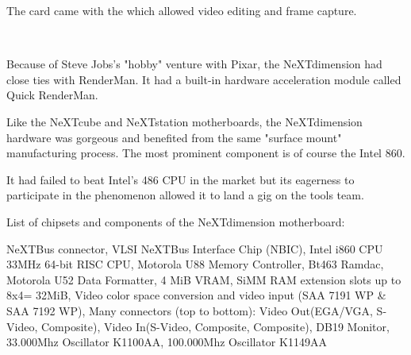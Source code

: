 \par
\vspace{-5pt}
The card came with the  which allowed video editing and frame capture.
\par
\vspace{3pt}
\\
\par
Because of Steve Jobs's "hobby" venture with Pixar, the NeXTdimension had close ties with RenderMan. It had a built-in hardware acceleration module called Quick RenderMan.\\
\par
\par






\par
Like the NeXTcube and NeXTstation motherboards, the NeXTdimension hardware was gorgeous and benefited from the same "surface mount" manufacturing process. The most prominent component is of course the Intel 860.\\
\par It had failed to beat Intel's 486 CPU in the market but its eagerness to participate in the \doom{} phenomenon allowed it to land a gig on the tools team.\\
\par
{}
\par
{}
\par
List of chipsets and components of the NeXTdimension motherboard:\\
\par 
{} NeXTBus connector,
 VLSI NeXTBus Interface Chip (NBIC),
 Intel i860 CPU 33MHz 64-bit RISC CPU,
 Motorola U88 Memory Controller,
 Bt463 Ramdac,
 Motorola U52 Data Formatter,
 4 MiB VRAM,
 SiMM RAM extension slots up to 8x4= 32MiB,
 Video color space conversion and video input (SAA 7191 WP \& SAA 7192 WP), 
 Many connectors (top to bottom): Video Out(EGA/VGA, S-Video, Composite), Video In(S-Video, Composite, Composite), DB19 Monitor,
 33.000Mhz Oscillator K1100AA,
 100.000Mhz Oscillator K1149AA
\par

